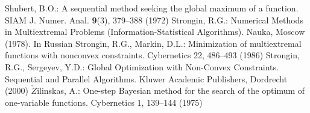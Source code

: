 \begin{thebibliography}{99.}
 Shubert, B.O.: A sequential method seeking the global maximum of a function. SIAM J. Numer. Anal. \textbf{9}(3), 379–388 (1972)
	Strongin, R.G.: Numerical Methods in Multiextremal Problems (Information-Statistical Algorithms). Nauka, Moscow (1978). In Russian
 Strongin, R.G., Markin, D.L.: Minimization of multiextremal functions with nonconvex constraints. Cybernetics 22, 486–493 (1986)
 Strongin, R.G., Sergeyev, Y.D.: Global Optimization with Non-Convex Constraints. Sequential and Parallel Algorithms. Kluwer Academic Publishers, Dordrecht (2000)
 $\check{Z}$ilinskas, A.: One-step Bayesian method for the search of the optimum of one-variable functions. Cybernetics 1, 139--144 (1975)
\end{thebibliography}

%
